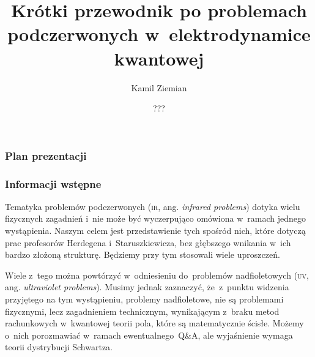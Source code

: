 \documentclass[10pt,t]{beamer}
\title{Krótki przewodnik po problemach podczerwonych
  w~elektrodynamice kwantowej}
\author{Kamil Ziemian \\
  \email}
\date[???]{???}
\begin{document}





\RaggedRight





\maketitle





\begin{frame}
  \frametitle{Plan prezentacji}


  \tableofcontents

\end{frame}










\begin{frame}
  \frametitle{Informacji wstępne}


  Tematyka problemów podczerwonych (\textsc{ir}, ang. \textit{infrared
    problems}) dotyka wielu fizycznych zagadnień i~nie może być
  wyczerpująco omówiona w~ramach jednego wystąpienia. Naszym
  celem jest przedstawienie tych spośród nich, które dotyczą prac profesorów
  Herdegena i~Staruszkiewicza, bez głębszego wnikania w~ich bardzo złożoną
  strukturę. Będziemy przy tym stosowali wiele uproszczeń.

  Wiele z~tego można powtórzyć w~odniesieniu do~problemów nadfioletowych
  (\textsc{uv}, ang. \textit{ultraviolet problems}). Musimy jednak
  zaznaczyć, że~z~punktu widzenia przyjętego na tym wystąpieniu, problemy
  nadfioletowe, \alert{nie} są problemami fizycznymi, lecz zagadnieniem
  technicznym, wynikającym z~braku metod rachunkowych w~kwantowej teorii
  pola, które są matematycznie ścisłe. Możemy o~nich porozmawiać
  w~ramach ewentualnego~Q\&A, ale wyjaśnienie wymaga teorii dystrybucji
  Schwartza.


\end{frame}
\end{document}
